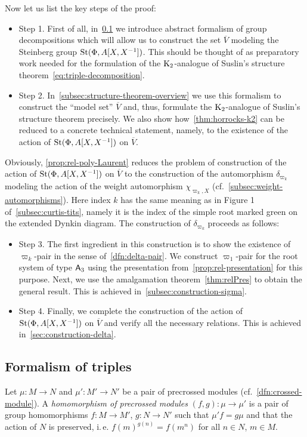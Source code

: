 Now let us list the key steps of the proof:
\begin{itemize}
    \item Step 1. First of all, in~\cref{subsec:triples} we introduce abstract formalism of group decompositions which will allow us to construct the set $\overline{V}$ modeling the Steinberg group $\operatorname{St}(\Phi, A[X, X^{-1}])$.
                  This should be thought of as preparatory work needed for the formulation of the $\operatorname{K}_2$-analogue of Suslin's structure theorem~\eqref{eq:triple-decomposition}.
    \item Step 2. In~\cref{subsec:structure-theorem-overview} we use this formalism to construct the ``model set'' $\overline{V}$ and, thus, formulate the $\operatorname{K}_2$-analogue of Suslin's structure theorem precisely.
                  We also show how~\cref{thm:horrocks-k2} can be reduced to a concrete technical statement, namely,
                  to the existence of the action of $\operatorname{St}(\Phi, A[X, X^{-1}])$ on $\overline{V}$.
\end{itemize}
Obviously, \cref{prop:rel-poly-Laurent} reduces the problem of construction of the action of $\operatorname{St}(\Phi, A[X, X^{-1}])$ on $\overline{V}$ to the construction of
 the automorphism $\delta_{\varpi_k}$ modeling the action of the weight automorphism $\chi_{\varpi_k, X}$ (cf.~\cref{subsec:weight-automorphisms}).
Here index $k$ has the same meaning as in Figure 1 of~\cref{subsec:curtis-tits}, namely it is the index of the simple root marked green on the extended Dynkin diagram.
The construction of $\delta_{\varpi_k}$ proceeds as follows:
\begin{itemize}
    \item Step 3. The first ingredient in this construction is to show the existence of $\varpi_k$-pair in the sense of~\cref{dfn:delta-pair}.
                  We construct $\varpi_1$-pair for the root system of type $\mathsf{A}_3$ using the presentation from~\cref{prop:rel-presentation} for this purpose.
                  Next, we use the amalgamation theorem~\cref{thm:relPres} to obtain the general result.
                  This is achieved in~\cref{subsec:construction-sigma}.
    \item Step 4. Finally, we complete the construction of the action of $\operatorname{St}(\Phi, A[X, X^{-1}])$ on $\overline{V}$ and verify all the necessary relations.
                  This is achieved in~\cref{sec:construction-delta}.
\end{itemize}

\subsection{Formalism of triples}\label{subsec:triples}
Let $\mu\colon M \to N$ and $\mu' \colon M' \to N'$ be a pair of precrossed modules (cf.~\cref{dfn:crossed-module}).
A \textit{homomorphism of precrossed modules} $(f, g)\colon \mu \to \mu'$ is a pair of group homomorphisms $f\colon M \to M'$, $g\colon N \to N'$ such that
$\mu'f = g \mu$ and that the action of $N$ is preserved, i.\,e. ${f(m)}^{g(n)} = f(m^n)$ for all $n \in N$, $m \in M$.

